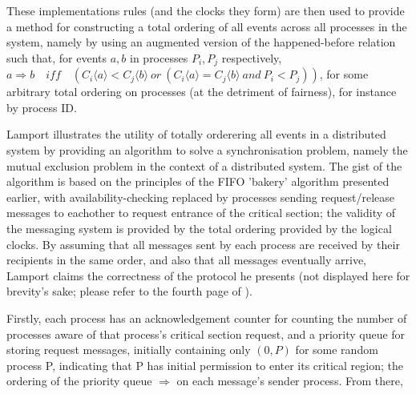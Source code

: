 \documentclass[11pt]{article}
\begin{document}
These implementations rules (and the clocks they form) are then used to provide
a method for constructing a total ordering of all events across all processes in
the system, namely by using an augmented version of the happened-before relation
such that, for events \( a,b \) in processes \( P_i,P_j \) respectively, 
\(
    a \Rightarrow b \quad iff 
        \quad (C_i \langle a \rangle < C_j \langle b \rangle \ or \ 
        (C_i \langle a \rangle = C_j \langle b \rangle \ and \ P_i < P_j )) 
\),
for some arbitrary total ordering on processes (at the detriment of fairness),
for instance by process ID.
\par
Lamport illustrates the utility of totally orderering all events in a
distributed system by providing an algorithm to solve a synchronisation problem,
namely the mutual exclusion problem in the context of a distributed system. The
gist of the algorithm is based on the principles of the FIFO 'bakery' algorithm
presented earlier, with availability-checking replaced by processes sending
request/release messages to eachother to request entrance of the critical
section; the validity of the messaging system is provided by the total ordering
provided by the logical clocks. By assuming that all messages sent by each
process are received by their recipients in the same order, and also that all
messages eventually arrive, Lamport claims the correctness of the protocol he
presents (not displayed here for brevity's sake; please refer to the fourth page
of \cite{lamport1978time}).
\iffalse
\par
Firstly, each process has an acknowledgement counter for counting the number of
processes aware of that process's critical section request, and a priority queue
for storing request messages, initially containing only \( (0,P) \) for some
random process P, indicating that P has initial permission to enter its critical
region; the ordering of the priority queue \( \Rightarrow \) on each message's
sender process. From there, 
\end{document}
